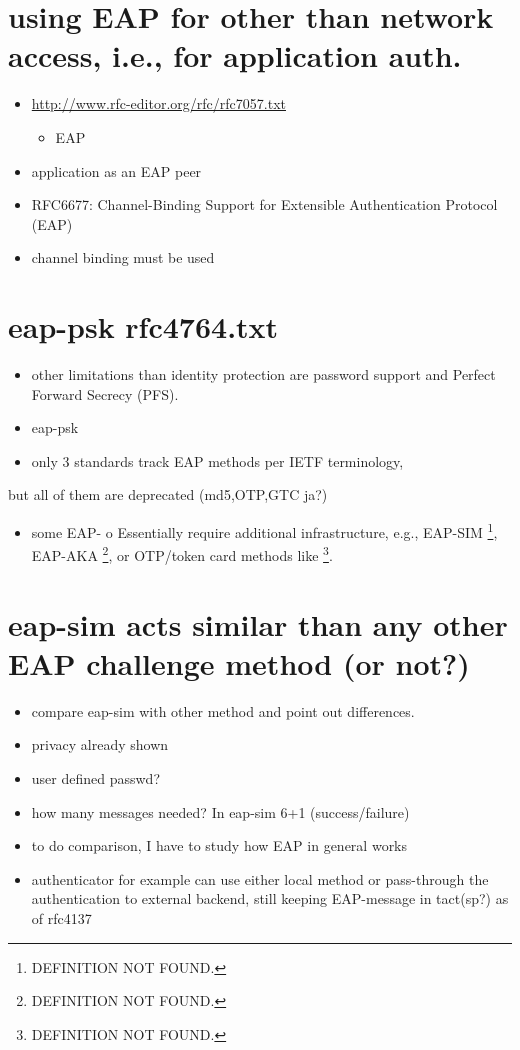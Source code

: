 \documentclass[12pt,a4paper,english]{tutthesis}
\begin{document}
\section{using EAP for other than network access, i.e., for application auth.}
\label{sec-7-2}
\begin{itemize}
\item \url{http://www.rfc-editor.org/rfc/rfc7057.txt}
\begin{itemize}
\item EAP
\end{itemize}
\item application as an EAP peer
\item RFC6677: Channel-Binding Support for Extensible Authentication Protocol (EAP)
\item channel binding must be used
\end{itemize}

\section{eap-psk rfc4764.txt}
\label{sec-7-3}
\begin{itemize}
\item other limitations than identity protection are password support and Perfect Forward Secrecy (PFS).
\item eap-psk
\item only 3 standards track EAP methods per IETF terminology,
\end{itemize}
but all of them are deprecated (md5,OTP,GTC ja?)
\begin{itemize}
\item some EAP- o  Essentially require additional infrastructure, e.g., EAP-SIM \footnote{DEFINITION NOT FOUND.},
EAP-AKA \footnote{DEFINITION NOT FOUND.}, or OTP/token card methods like \footnote{DEFINITION NOT FOUND.}.
\end{itemize}


\section{eap-sim acts similar than any other EAP challenge method (or not?)}
\label{sec-7-4}
\begin{itemize}
\item compare eap-sim with other method and point out differences.
\item privacy already shown
\item user defined passwd?
\item how many messages needed? In eap-sim 6+1 (success/failure)
\item to do comparison, I have to study how EAP in general works
\item authenticator for example can use either local method or
pass-through the authentication to external backend, still keeping
EAP-message in tact(sp?) as of  rfc4137
\end{itemize}
\end{document}
